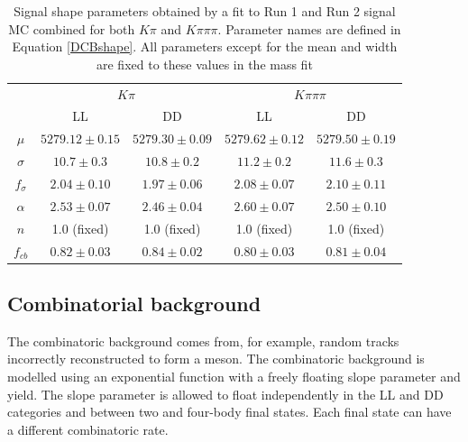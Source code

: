\begin{table}[h]
\centering
\begin{tabular}{c|cc|cc}
\hline
& \multicolumn{2}{c}{$K\pi$} & \multicolumn{2}{c}{$K\pi\pi\pi$} \\
& LL & DD & LL & DD\\
\hline
$\mu$ & $5279.12 \pm 0.15$ & $5279.30 \pm 0.09$ & $5279.62 \pm 0.12$ & $5279.50 \pm 0.19$ \\
$\sigma$ & $10.7 \pm 0.3$ & $10.8 \pm 0.2$ & $11.2 \pm 0.2$ & $11.6 \pm 0.3$ \\
$f_{\sigma}$ & $2.04 \pm 0.10$ & $1.97 \pm 0.06$ & $2.08 \pm 0.07$ & $2.10 \pm 0.11$ \\
$\alpha$ & $2.53 \pm 0.07$ & $2.46 \pm 0.04$ & $2.60 \pm 0.07$ & $2.50 \pm 0.10$ \\
$n$ & 1.0 (fixed) & 1.0 (fixed) & 1.0 (fixed) & 1.0 (fixed) \\
$f_{cb}$ & $0.82 \pm 0.03$ & $0.84 \pm 0.02$ & $0.80 \pm 0.03$ & $0.81 \pm 0.04	$ \\
\hline
\end{tabular}
\caption{Signal shape parameters obtained by a fit to Run 1 and Run 2 signal MC combined for both $K\pi$ and $K\pi\pi\pi$. Parameter names are defined in Equation \ref{DCBshape}. All parameters except for the mean and width are fixed to these values in the mass fit}
\label{signalparameters}
\end{table}



\subsection{Combinatorial background}
\label{sec:massfit:combinatorial}

The combinatoric background comes from, for example, random tracks incorrectly reconstructed to form a \D meson. The combinatoric background is modelled using an exponential function with a freely floating slope parameter and yield. The slope parameter is allowed to float independently in the LL and DD categories and between two and four-body \D final states. Each \D final state can have a different combinatoric rate.


